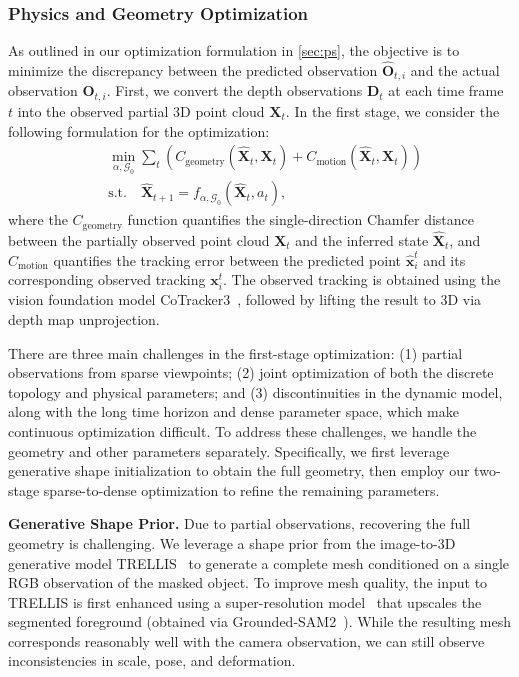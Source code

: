 \subsubsection{Physics and Geometry Optimization}
\label{sec:invphysics}
As outlined in our optimization formulation in \cref{sec:ps}, the objective is to minimize the discrepancy between the predicted observation \( \hat{\mathbf{O}}_{t,i} \) and the actual observation \( \mathbf{O}_{t,i} \). First, we convert the depth observations \( \mathbf{D}_t \) at each time frame \( t \) into the observed partial 3D point cloud \( \mathbf{X}_{t} \). 
In the first stage, we consider the following formulation for the optimization:
\begin{equation}
\label{eq:physics_and_geometry}
\begin{aligned}
    &\min_{\alpha, \mathcal{G}_0} \sum_t \left( C_{\text{geometry}}(\hat{\mathbf{X}}_t, \mathbf{X}_{t}) + C_{\text{motion}}(\hat{\mathbf{X}}_t, \mathbf{X}_{t}) \right) \\
    &\text{s.t.} \quad \hat{\mathbf{X}}_{t+1} = f_{\alpha, \mathcal{G}_0} (\hat{\mathbf{X}}_{t}, a_t),
\end{aligned}
\end{equation}
where the \( C_{\text{geometry}} \) function quantifies the single-direction Chamfer distance between the partially observed point cloud \( \mathbf{X}_{t} \) and the inferred state \( \hat{\mathbf{X}}_t \), and \( C_{\text{motion}} \) quantifies the tracking error between the predicted point \( \hat{\mathbf{x}}_i^t \) and its corresponding observed tracking \( \mathbf{x}_i^t \). The observed tracking is obtained using the vision foundation model CoTracker3~\cite{karaev2024cotracker3}, followed by lifting the result to 3D via depth map unprojection.


There are three main challenges in the first-stage optimization: (1) partial observations from sparse viewpoints; (2) joint optimization of both the discrete topology and physical parameters; and (3) discontinuities in the dynamic model, along with the long time horizon and dense parameter space, which make continuous optimization difficult. To address these challenges, we handle the geometry and other parameters separately. Specifically, we first leverage generative shape initialization to obtain the full geometry, then employ our two-stage sparse-to-dense optimization to refine the remaining parameters.

\textbf{Generative Shape Prior.} 
Due to partial observations, recovering the full geometry is challenging. We leverage a shape prior from the image-to-3D generative model TRELLIS~\cite{xiang2024structured} to generate a complete mesh conditioned on a single RGB observation of the masked object. To improve mesh quality, the input to TRELLIS is first enhanced using a super-resolution model~\cite{rombach2022high} that upscales the segmented foreground (obtained via Grounded-SAM2~\cite{ren2024grounded}). While the resulting mesh corresponds reasonably well with the camera observation, we can still observe inconsistencies in scale, pose, and deformation.

